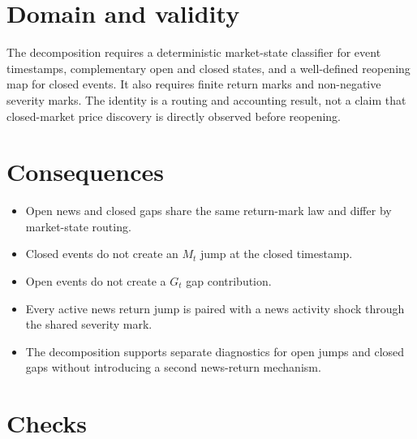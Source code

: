 \documentclass[11pt]{article}
\begin{document}
\section{Domain and validity}

The decomposition requires a deterministic market-state classifier for event
timestamps, complementary open and closed states, and a well-defined reopening
map for closed events.
It also requires finite return marks and non-negative severity marks.
The identity is a routing and accounting result, not a claim that closed-market
price discovery is directly observed before reopening.

\section{Consequences}

\begin{itemize}
    \item Open news and closed gaps share the same return-mark law and differ by market-state routing.
    \item Closed events do not create an \(M_t\) jump at the closed timestamp.
    \item Open events do not create a \(G_t\) gap contribution.
    \item Every active news return jump is paired with a news activity shock through the shared severity mark.
    \item The decomposition supports separate diagnostics for open jumps and closed gaps without introducing a second news-return mechanism.
\end{itemize}

\section{Checks}
\end{document}

